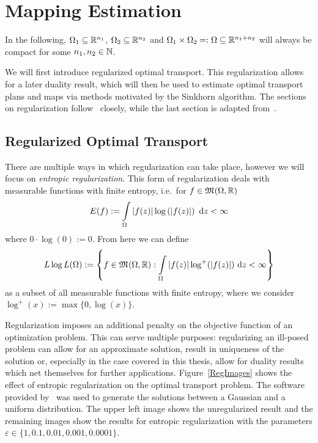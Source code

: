 \chapter{Mapping Estimation}\label{DualPlanEst}

In the following, $\Omega_1 \subseteq \R^{n_1}$, $\Omega_2 \subseteq \R^{n_2}$ and $\Omega_1 \times \Omega_2 =: \Omega \subseteq \R^{n_1 + n_2}$ will always be compact for some $\NinN[n_1, n_2]$.

We will first introduce regularized optimal transport. This regularization allows for a later duality result, which will then be used to estimate optimal transport plans and maps via methods motivated by the Sinkhorn algorithm. The sections on regularization follow\ \cite{Cla2021} closely, while the last section is adapted from\ \cite{Seg2018}.

\section{Regularized Optimal Transport}\label{RegOT}

There are multiple ways in which regularization can take place, however we will focus on \textit{entropic regularization}. This form of regularization deals with measurable functions with finite entropy, i.e.~for $f \in \MF{\Omega}{\R}$
\[ E(f) := \int\limits_\Omega \vert f(z) \vert \log\left( \vert f(z) \vert \right)~\D[z] < \infty \]
where $0 \cdot \log(0) := 0$. From here we can define
\[ \LLL := \left\{ f \in \MF{\Omega}{\R} : \int\limits_\Omega \vert f(z) \vert \log^+(\vert f(z) \vert)~\D[z] < \infty \right\} \]
as a subset of all measurable functions with finite entropy, where we consider $\log^+(x) := \max \{ 0, \log (x) \}$.

Regularization imposes an additional penalty on the objective function of an optimization problem. This can serve multiple purposes: regularizing an ill-posed problem can allow for an approximate solution, result in uniqueness of the solution or, especially in the case covered in this thesis, allow for duality results which net themselves for further applications. Figure~\ref{RegImages} shows the effect of entropic regularization on the optimal transport problem. The software provided by\ \cite{PythonOT} was used to generate the solutions between a Gaussian and a uniform distribution. The upper left image shows the unregularized result and the remaining images show the results for entropic regularization with the parameters $\varepsilon \in \{ 1, 0.1, 0.01, 0.001, 0.0001 \}$.

